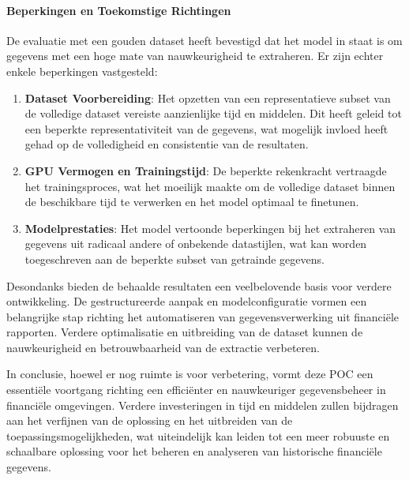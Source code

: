 \paragraph{Beperkingen en Toekomstige Richtingen}
De evaluatie met een gouden dataset heeft bevestigd dat het model in staat is om gegevens met een hoge mate van nauwkeurigheid te extraheren. Er zijn echter enkele beperkingen vastgesteld:
\begin{enumerate}
    \item \textbf{Dataset Voorbereiding}: Het opzetten van een representatieve subset van de volledige dataset vereiste aanzienlijke tijd en middelen. Dit heeft geleid tot een beperkte representativiteit van de gegevens, wat mogelijk invloed heeft gehad op de volledigheid en consistentie van de resultaten.
    
    \item \textbf{GPU Vermogen en Trainingstijd}: De beperkte rekenkracht vertraagde het trainingsproces, wat het moeilijk maakte om de volledige dataset binnen de beschikbare tijd te verwerken en het model optimaal te finetunen.
    
    \item \textbf{Modelprestaties}: Het model vertoonde beperkingen bij het extraheren van gegevens uit radicaal andere of onbekende datastijlen, wat kan worden toegeschreven aan de beperkte subset van getrainde gegevens.
\end{enumerate}

Desondanks bieden de behaalde resultaten een veelbelovende basis voor verdere ontwikkeling. De gestructureerde aanpak en modelconfiguratie vormen een belangrijke stap richting het automatiseren van gegevensverwerking uit financiële rapporten. Verdere optimalisatie en uitbreiding van de dataset kunnen de nauwkeurigheid en betrouwbaarheid van de extractie verbeteren.

In conclusie, hoewel er nog ruimte is voor verbetering, vormt deze POC een essentiële voortgang richting een efficiënter en nauwkeuriger gegevensbeheer in financiële omgevingen. Verdere investeringen in tijd en middelen zullen bijdragen aan het verfijnen van de oplossing en het uitbreiden van de toepassingsmogelijkheden, wat uiteindelijk kan leiden tot een meer robuuste en schaalbare oplossing voor het beheren en analyseren van historische financiële gegevens.